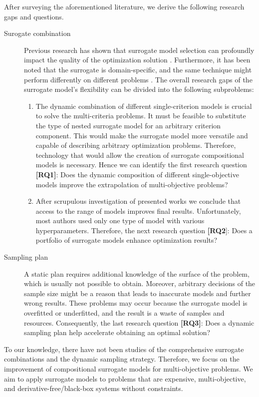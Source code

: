         After surveying the aforementioned literature, we derive the following research gaps and questions.
        \begin{description}
            \item[Surogate combination] Previous research has shown that surrogate model selection can profoundly impact the quality of the optimization solution \cite{HybridSurrRCG}. Furthermore, it has been noted that the surrogate is domain-specific, and the same technique might perform differently on different problems \cite{LuST19}. The overall research gaps of the surrogate model's flexibility can be divided into the following subproblems:
            \begin{enumerate}
                \item The dynamic combination of different single-criterion models is crucial to solve the multi-criteria problems. It must be feasible to substitute the type of nested surrogate model for an arbitrary criterion component. This would make the surrogate model more versatile and capable of describing arbitrary optimization problems. Therefore, technology that would allow the creation of surrogate compositional models is necessary. Hence we can identify the first research question \textbf{[RQ1]}: Does the dynamic composition of different single-objective models improve the extrapolation of multi-objective problems?
                \item After scrupulous investigation of presented works we conclude that access to the range of models improves final results. Unfortunately, most authors used only one type of model with various hyperparameters. Therefore, the next research question \textbf{[RQ2}]: Does a portfolio of surrogate models enhance optimization results?
            \end{enumerate}
            \item[Sampling plan] A static plan requires additional knowledge of the surface of the problem, which is usually not possible to obtain. Moreover, arbitrary decisions of the sample size might be a reason that leads to inaccurate models and further wrong results. These problems may occur because the surrogate model is overfitted or underfitted, and the result is a waste of samples and resources. Consequently, the last research question \textbf{[RQ3]}: Does a dynamic sampling plan help accelerate obtaining an optimal solution?
        \end{description}

        To our knowledge, there have not been studies of the comprehensive surrogate combinations and the dynamic sampling strategy.   Therefore, we focus on the improvement of compositional surrogate models for multi-objective problems. We aim to apply surrogate models to problems that are expensive, multi-objective, and derivative-free/black-box systems without constraints.
